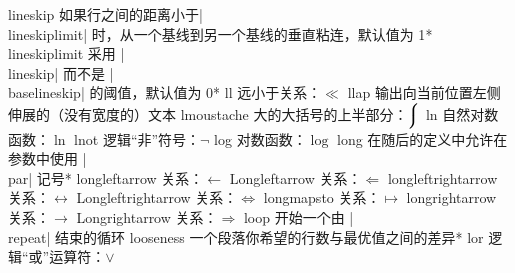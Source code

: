 \capcs lineskip {如果行之间的距离小于|\\lineskiplimit| 时，从一个基线到另一个基线的垂直粘连，默认值为 1\pt}*{}
\capcs lineskiplimit {采用 |\\lineskip| 而不是 |\\base\-line\-skip| 的阈值，默认值为 0\pt}*{}
\capcs ll {远小于关系：$\ll$}{}{}
\capcs llap {输出向当前位置左侧伸展的（没有宽度的）文本}{}{}
\capcs lmoustache {大的大括号的上半部分：$\big\lmoustache$}{}{}
\capcs ln {自然对数函数：$\ln$}{}{}
\capcs lnot {逻辑“非”符号：$\lnot$}{}{}
\capcs log {对数函数：$\log$}{}{}
\capcs long {在随后的定义中允许在参数中使用 |\\par| 记号}*{}
\capcs longleftarrow {关系：$\longleftarrow$}{}{}
\capcs Longleftarrow {关系：$\Longleftarrow$}{}{}
\capcs longleftrightarrow {关系：$\longleftrightarrow$}{}{}
\capcs Longleftrightarrow {关系：$\Longleftrightarrow$}{}{}
\capcs longmapsto {关系：$\longmapsto$}{}{}
\capcs longrightarrow {关系：$\longrightarrow$}{}{}
\capcs Longrightarrow {关系：$\Longrightarrow$}{}{}
\capcs loop {开始一个由 |\\repeat| 结束的循环}{}{}
\capcs looseness {一个段落你希望的行数与最优值之间的差异}*{}
\capcs lor {逻辑“或”运算符：$\lor$}{}{}

